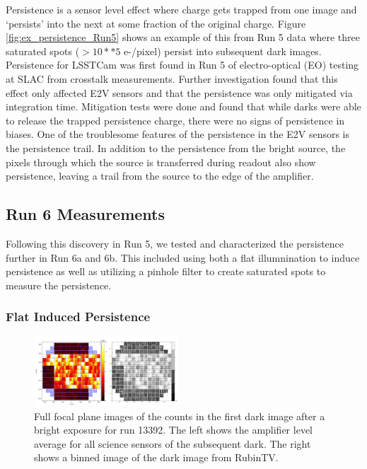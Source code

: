 \documentclass[DM,authoryear,toc]{lsstdoc}
\begin{document}
Persistence is a sensor level effect where charge gets trapped from one image and `persists' into the next at some fraction of the original charge. 
Figure \ref{fig:ex_persistence_Run5} shows an example of this from Run 5 data where three saturated spots ($>10**5$ e-/pixel) persist into subsequent dark images. 
Persistence for LSSTCam was first found in Run 5 of electro-optical (EO) testing at SLAC from crosstalk measurements. 
Further investigation found that this effect only affected E2V sensors
and that the persistence was only mitigated via integration time. 
Mitigation tests were done and found that while darks were able to release the trapped persistence charge, there were no signs of persistence in biases. 
One of the troublesome features of the persistence in the E2V sensors is the persistence trail. 
In addition to the persistence from the bright source, the pixels through which the source is transferred during readout also show persistence, leaving a trail from the source to the edge of the amplifier.

\subsection{Run 6 Measurements}
Following this discovery in Run 5, we tested and characterized the persistence further in Run 6a and 6b. 
This included using both a flat illumnination to induce persistence as well as utilizing a pinhole filter to create saturated spots to measure the persistence.

\subsubsection{Flat Induced Persistence}
\begin{figure}[!htp]
  \centering
  \includegraphics[width=0.48\textwidth, angle=0]{Ex_Flat_FP_combined.png}
  \caption{
  Full focal plane images of the counts in the first dark image after a bright exposure for run 13392.
  The left shows the amplifier level average for all science sensors of the subsequent dark.
  The right shows a binned image of the dark image from RubinTV\@.
  }\label{fig:Flat_Induced}
\end{figure}
\end{document}
